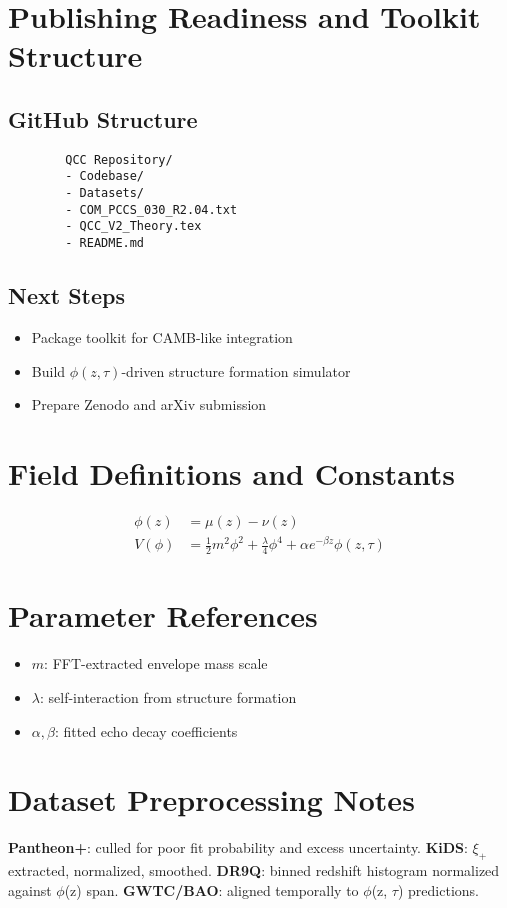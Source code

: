 \documentclass[12pt]{article}
\begin{document}
	\section{Publishing Readiness and Toolkit Structure}
	\subsection{GitHub Structure}
	\begin{verbatim}
		QCC Repository/
		- Codebase/
		- Datasets/
		- COM_PCCS_030_R2.04.txt
		- QCC_V2_Theory.tex
		- README.md
	\end{verbatim}
	
	\subsection{Next Steps}
	\begin{itemize}
		\item Package toolkit for CAMB-like integration
		\item Build \( \phi(z, \tau) \)-driven structure formation simulator
		\item Prepare Zenodo and arXiv submission
	\end{itemize}
	
	\appendix
	\section{Field Definitions and Constants}
	\begin{align*}
		\phi(z) &= \mu(z) - \nu(z) \\
		V(\phi) &= \frac{1}{2} m^2 \phi^2 + \frac{\lambda}{4} \phi^4 + \alpha e^{-\beta z} \phi(z, \tau)
	\end{align*}
	
	\section{Parameter References}
	\begin{itemize}
		\item \( m \): FFT-extracted envelope mass scale
		\item \( \lambda \): self-interaction from structure formation
		\item \( \alpha, \beta \): fitted echo decay coefficients
	\end{itemize}
	
	\section{Dataset Preprocessing Notes}
	\textbf{Pantheon+}: culled for poor fit probability and excess uncertainty.  
	\textbf{KiDS}: $\xi_+$ extracted, normalized, smoothed.  
	\textbf{DR9Q}: binned redshift histogram normalized against $\phi$(z) span.  
	\textbf{GWTC/BAO}: aligned temporally to $\phi$(z, $\tau$) predictions.
	
\end{document}
